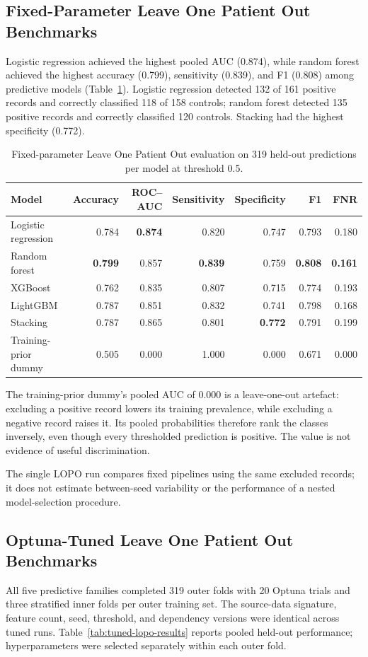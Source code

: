 \subsection{Fixed-Parameter Leave One Patient Out Benchmarks}
Logistic regression achieved the highest pooled AUC (0.874), while random forest achieved the highest accuracy (0.799), sensitivity (0.839), and F1 (0.808) among predictive models (Table~\ref{tab:building-lopo-results}). Logistic regression detected 132 of 161 positive records and correctly classified 118 of 158 controls; random forest detected 135 positive records and correctly classified 120 controls. Stacking had the highest specificity (0.772).

\begin{table}[tbp]
\centering
\footnotesize
\caption{Fixed-parameter Leave One Patient Out evaluation on 319 held-out predictions per model at threshold 0.5.}
\label{tab:building-lopo-results}
\begin{tabular}{@{}lrrrrrr@{}}
\toprule
Model & Accuracy & ROC--AUC & Sensitivity & Specificity & F1 & FNR \\
\midrule
Logistic regression & 0.784 & \textbf{0.874} & 0.820 & 0.747 & 0.793 & 0.180 \\
Random forest & \textbf{0.799} & 0.857 & \textbf{0.839} & 0.759 & \textbf{0.808} & \textbf{0.161} \\
XGBoost & 0.762 & 0.835 & 0.807 & 0.715 & 0.774 & 0.193 \\
LightGBM & 0.787 & 0.851 & 0.832 & 0.741 & 0.798 & 0.168 \\
Stacking & 0.787 & 0.865 & 0.801 & \textbf{0.772} & 0.791 & 0.199 \\
\midrule
Training-prior dummy & 0.505 & 0.000 & 1.000 & 0.000 & 0.671 & 0.000 \\
\bottomrule
\end{tabular}
\end{table}
The training-prior dummy's pooled AUC of 0.000 is a leave-one-out artefact: excluding a positive record lowers its training prevalence, while excluding a negative record raises it. Its pooled probabilities therefore rank the classes inversely, even though every thresholded prediction is positive. The value is not evidence of useful discrimination.

The single LOPO run compares fixed pipelines using the same excluded records; it does not estimate between-seed variability or the performance of a nested model-selection procedure.

\subsection{Optuna-Tuned Leave One Patient Out Benchmarks}
All five predictive families completed 319 outer folds with 20 Optuna trials and three stratified inner folds per outer training set. The source-data signature, feature count, seed, threshold, and dependency versions were identical across tuned runs. Table~\ref{tab:tuned-lopo-results} reports pooled held-out performance; hyperparameters were selected separately within each outer fold.

